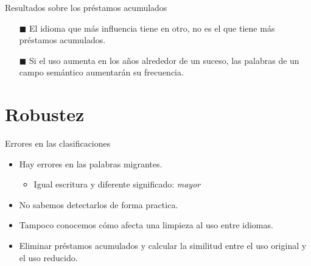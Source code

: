 \documentclass[10pt,xcolor={usenames,dvipsnames}]{beamer}
\begin{document}

\begin{frame}{Resultados sobre los préstamos acumulados}
	\begin{itemize}
		
		\item [$\blacksquare$] El idioma que más influencia tiene en otro, no es el que tiene más préstamos acumulados.
		
		\item [$\blacksquare$] Si el uso aumenta en los años alrededor de un suceso, las palabras de un campo semántico aumentarán su frecuencia.

	\end{itemize}
\end{frame}


\section{Robustez} 

\begin{frame}[fragile]{Errores en las clasificaciones}
	
	\begin{itemize}
		\item <1->[$\blacksquare$] Hay errores en las palabras migrantes.
		\begin{itemize}
			\item Igual escritura y diferente significado: \textcolor{Sepia}{\textit{mayor}}
		\end{itemize}
	
		\item <2->[$\blacksquare$]No sabemos detectarlos de forma practica.
			
		\item <3->[$\blacksquare$]Tampoco conocemos cómo afecta una limpieza al uso entre idiomas.
	\end{itemize}
	
	\begin{itemize}
		\item <4-> [$\blacksquare$]Eliminar préstamos acumulados y calcular la similitud entre el uso original y el uso reducido.
		\visible<5>{
		$$
		\left\langle D \right\rangle  = \frac{1}{N}\sum_{t=1}^{N} \left| u_{t} - r_{t} \right|.
		$$
		}
	\end{itemize}
\end{frame}
\end{document}
